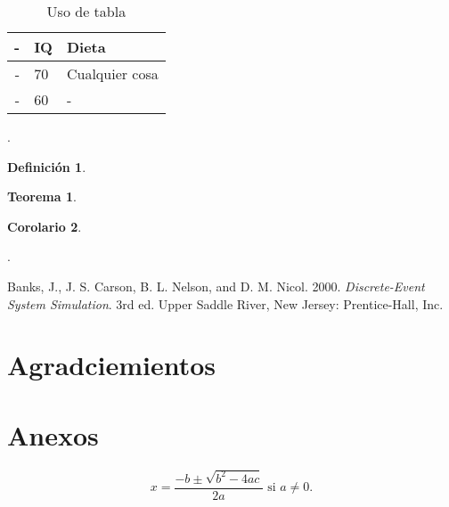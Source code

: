 \documentclass{wscpaperproc}
\theoremstyle{wsc}
\newtheorem{theorem}{Teorema}
\newtheorem{corollary}[theorem]{Corolario}
\newtheorem{definition}{Definición}
\begin{document}
\begin{table}[htb]
	\centering
	\caption{Uso de tabla\label{tab: first}}
	\begin{tabular}{rll}
		\hline
		- & IQ & Dieta          \\ \hline
		- & 70 & Cualquier cosa \\
		- & 60 & -              \\
		\hline
	\end{tabular}
\end{table}


.
\begin{definition}

\end{definition}

\begin{theorem}

\end{theorem}

\begin{corollary}

\end{corollary}

.



	{\footnotesize
		\begin{hangref}
			\item Banks, J., J. S. Carson, B. L. Nelson, and D. M. Nicol. 2000. \textit{Discrete-Event System Simulation}. 3rd ed. Upper Saddle River, New Jersey: Prentice-Hall, Inc.
		\end{hangref}
	}










\section*{Agradciemientos}


\appendix

\section{Anexos} \label{app:quadratic}

\begin{equation} \label{eq:quadraticsol}
	x = \frac{-b \pm \sqrt{b^2-4ac}}{2a} \mbox{ si } a \ne 0.
\end{equation}
\end{document}
